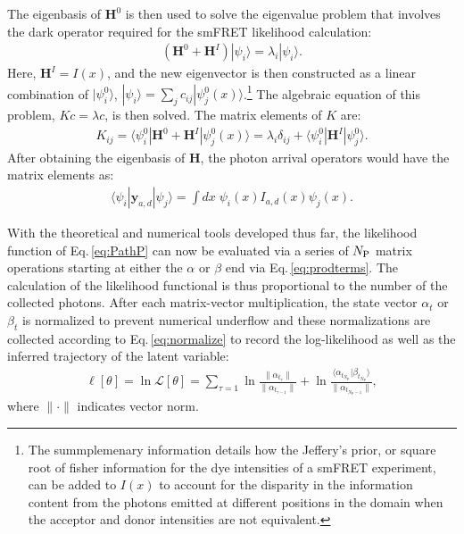 \documentclass[journal=jpcbfk,manuscript=article,layout=twocolumn,articletitle=true]{achemso}
\begin{document}
The eigenbasis of $\bm{H}^0$ is then used to solve the eigenvalue problem that involves the dark operator required for the smFRET likelihood calculation: 
\begin{align}
\label{eq:PsiBasis}
\left ( \bm{H}^0 + \bm{H}^I \right ) | \psi_i \rangle = \lambda_i | \psi_i \rangle.
\end{align}
Here, $\bm{H}^I=I(x)$, and the new eigenvector is then constructed as a linear combination of $|\psi^0_i \rangle$, $ | \psi_i \rangle = \sum_j c_{ij} | \psi_j^0(x) \rangle $.\footnote{The summplemenary information details how the Jeffery's prior, or square root of fisher information for the dye intensities of a smFRET experiment, can be added to $I(x)$ to account for the disparity in the information content from the photons emitted at different positions in the domain when the acceptor and donor intensities are not equivalent.} The algebraic equation of this problem, $Kc=\lambda c$, is then solved. The matrix elements of $K$ are: 
\begin{align}
K_{ij} = \langle \psi_i^0 | \bm{H}^0 + \bm{H}^I | \psi^0_j(x) \rangle = \lambda_i \delta_{ij} + \langle \psi_i^0 | \bm{H}^I |\psi^0_j \rangle.
\end{align}
After obtaining the eigenbasis of $\bm{H}$, the photon arrival operators would have the matrix elements as:
\begin{align}
\langle \psi_i | \bm{y}_{a,d} | \psi_j \rangle = \int dx \; \psi_i(x)I_{a,d}(x)\psi_j(x).
\end{align}

With the theoretical and numerical tools developed thus far, the likelihood function of Eq.\,\ref{eq:PathP} can now be evaluated via a series of $N_{\rm P}$ matrix operations starting at either the $\alpha$ or $\beta$ end via Eq.\,\ref{eq:prodterms}. The calculation of the likelihood functional is thus proportional to the number of the collected photons. After each matrix-vector multiplication, the state vector $\alpha_t$ or $\beta_t$ is normalized to prevent numerical underflow and these normalizations are collected according to Eq.\,\ref{eq:normalize} to record the log-likelihood as well as the inferred trajectory of the latent variable:\cite{Turner:2008uv} 
\begin{align}
\label{eq:normalize}
\ell[\theta] = \ln \mathcal{L}[\theta] = \sum_{\tau=1} \ln \frac{\|\alpha_{t_\tau}\|}{\|\alpha_{t_{\tau-1}}\|} +  \ln \frac{\langle \alpha_{t_{N_{\mathrm{P}}}}|\beta_{t_{N_{\mathrm{P}}}} \rangle}{\|\alpha_{t_{N_{\mathrm{P}}-1}}\|},
\end{align}
where $\|\cdot\|$ indicates vector norm.  
\end{document}
